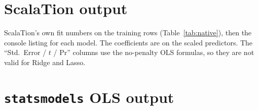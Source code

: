 \documentclass[11pt]{article}
\begin{document}
\appendix
\section{ScalaTion output}\label{app:native}
ScalaTion's own fit numbers on the training rows (Table~\ref{tab:native}), then the console listing for each model. The coefficients are on
the scaled predictors. The ``Std.\ Error / $t$ / Pr'' columns use the no-penalty OLS formulas, so they are not valid for Ridge and Lasso.

\begin{table}[htbp]
\centering\small

\caption{ScalaTion fit on the training rows ($m$ is the number of rows).}\label{tab:native}
\end{table}

{\scriptsize}

\section{\texttt{statsmodels} OLS output}
{\footnotesize}
\end{document}
